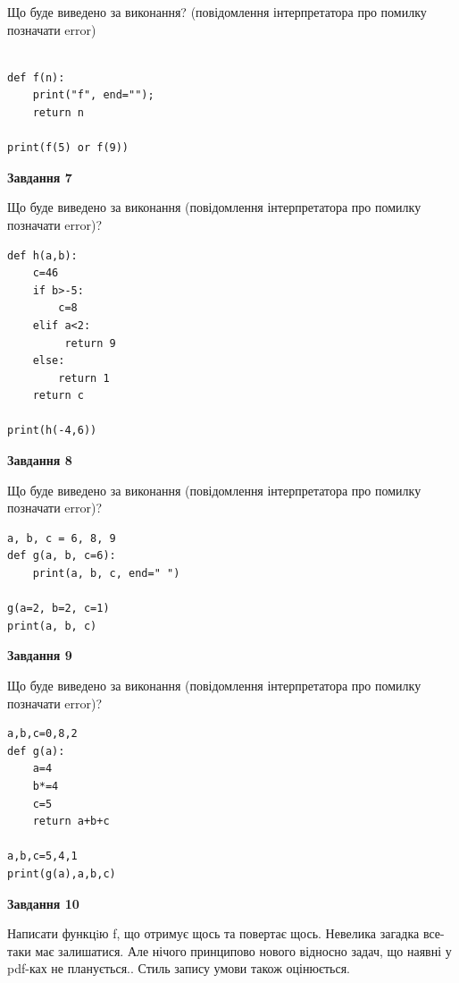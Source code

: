 \documentclass[12pt, ukrainian]{article}
\begin{document}
{\begin {large}
Що буде виведено за виконання? (повідомлення інтерпретатора про помилку позначати error)\par
\begin{verbatim}

def f(n):
    print("f", end="");
    return n

print(f(5) or f(9))
\end{verbatim}

{\begin {center}\textbf{Завдання 7}\end {center}}

Що буде виведено за виконання (повідомлення інтерпретатора про помилку позначати error)?\par
\begin{verbatim}
def h(a,b):
    c=46
    if b>-5:
        c=8
    elif a<2:
         return 9
    else: 
        return 1
    return c

print(h(-4,6))
\end{verbatim}

{\begin {center}\textbf{Завдання 8}\end {center}}

Що буде виведено за виконання (повідомлення інтерпретатора про помилку позначати error)?\par
\begin{verbatim}
a, b, c = 6, 8, 9
def g(a, b, c=6):
    print(a, b, c, end=" ")

g(a=2, b=2, c=1)
print(a, b, c)
\end{verbatim}

{\begin {center}\textbf{Завдання 9}\end {center}}

Що буде виведено за виконання (повідомлення інтерпретатора про помилку позначати error)?\par
\begin{verbatim}
a,b,c=0,8,2
def g(a):
    a=4
    b*=4
    c=5
    return a+b+c

a,b,c=5,4,1
print(g(a),a,b,c)
\end{verbatim}

{\begin {center}\textbf{Завдання 10}\end {center}}


Написати функцiю f, що отримує щось та повертає щось. Невелика загадка все-таки має залишатися. Але нічого принципово нового відносно задач, що наявні у pdf-ках не планується.. Стиль запису умови також оцінюється.\par
\end {large}}
\newpage
\end{document}

